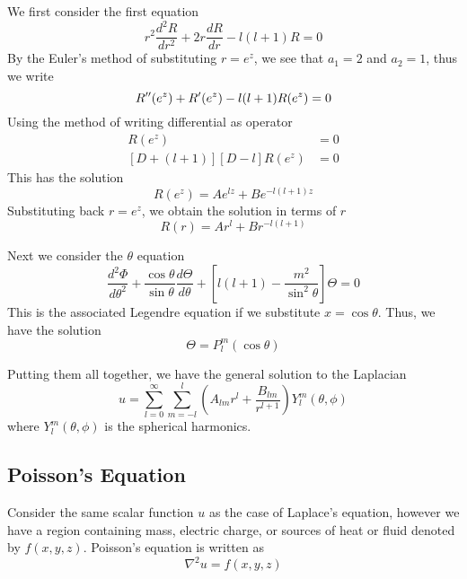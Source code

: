 \documentclass[../../../main.tex]{subfiles}
\begin{document}
We first consider the first equation
\begin{equation*}
    r^2\frac{d^2R}{dr^2}+2r\frac{dR}{dr}-l(l+1)R=0
\end{equation*}
By the Euler's method of substituting $r=e^z$, we see that $a_1=2$ and $a_2=1$, thus we write
\begin{equation*}
    R''(e^z)+R'(e^z)-l(l+1)R(e^z)=0\\
\end{equation*}
Using the method of writing differential as operator
\begin{align*}
    [D^2+D-l(l+1)] R(e^z) & =0 \\
    [D+(l+1)][D-l]R(e^z)  & =0
\end{align*}
This has the solution
\begin{equation*}
    R(e^z)= Ae^{lz}+Be^{-l(l+1)z}
\end{equation*}
Substituting back $r=e^z$, we obtain the solution in terms of $r$
\begin{equation*}
    R(r)= Ar^{l}+Br^{-l(l+1)}
\end{equation*}

Next we consider the $\theta$ equation
\begin{equation*}
    \frac{d^2\Phi}{d\theta^2} +\frac{\cos \theta}{\sin\theta}\frac{d\Theta}{d\theta} +\left[l(l+1)-\frac{m^2}{\sin^2\theta} \right]\Theta =0
\end{equation*}
This is the associated Legendre equation if we substitute $x=\cos \theta$. 
 Thus, we have the solution
\begin{equation*}
    \Theta=P_l^m(\cos\theta)
\end{equation*}

Putting them all together, we have the general solution to the Laplacian
\begin{equation*}
    u=\sum_{l=0}^{\infty}\sum_{m=-l }^{l}\left(A_{lm}r^l +\frac{B_{lm}}{r^{l+1}}\right)Y_l^m(\theta,\phi)
\end{equation*}
where $Y_l^m(\theta,\phi)$ is the spherical harmonics.


\subsection{Poisson’s Equation}
Consider the same scalar function $u$ as the case of Laplace's equation, however we have a region containing mass, electric charge, or sources of heat or fluid denoted by $f(x,y,z)$. 
Poisson's equation is written as
\begin{equation*}
    \nabla^2 u=f(x,y,z)
\end{equation*}
\end{document}
